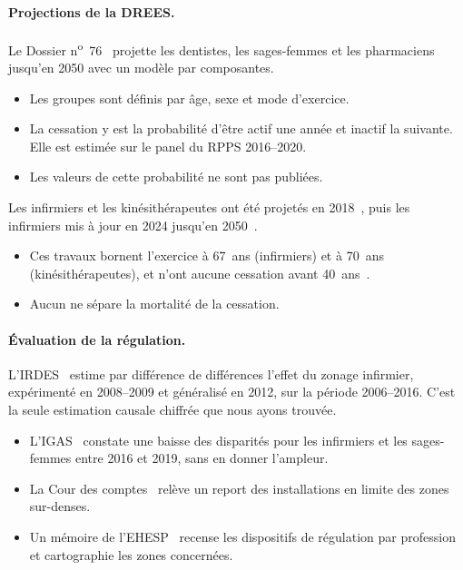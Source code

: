 \documentclass[11pt]{article}
\begin{document}
\paragraph{Projections de la DREES.}
Le Dossier n\textsuperscript{o}~76~\cite{dd76} projette les dentistes, les
sages-femmes et les pharmaciens jusqu'en 2050 avec un modèle par
composantes.
\begin{itemize}
\item Les groupes sont définis par âge, sexe et mode d'exercice.
\item La cessation y est la probabilité d'être actif une année et inactif la
  suivante. Elle est estimée sur le panel du RPPS 2016--2020.
\item Les valeurs de cette probabilité ne sont pas publiées.
\end{itemize}
Les infirmiers et les kinésithérapeutes ont été projetés en
2018~\cite{er1062,er1075}, puis les infirmiers mis à jour en 2024
jusqu'en 2050~\cite{er1319}.
\begin{itemize}
\item Ces travaux bornent l'exercice à 67~ans (infirmiers) et à 70~ans
  (kinésithérapeutes), et n'ont aucune cessation avant 40~ans~\cite{er1062,er1075}.
\item Aucun ne sépare la mortalité de la cessation.
\end{itemize}

\paragraph{Évaluation de la régulation.}
L'IRDES~\cite{irdes270} estime par différence de différences l'effet du
zonage infirmier, expérimenté en 2008--2009 et généralisé en 2012, sur la période 2006--2016. C'est la seule
estimation causale chiffrée que nous ayons trouvée.
\begin{itemize}
\item L'IGAS~\cite{igas2023} constate une baisse des disparités pour les
  infirmiers et les sages-femmes entre 2016 et 2019, sans en donner
  l'ampleur.
\item La Cour des comptes~\cite{ccomptes2024} relève un report des
  installations en limite des zones sur-denses.
\item Un mémoire de l'EHESP~\cite{bahroun2025} recense les dispositifs de
  régulation par profession et cartographie les zones concernées.
\end{itemize}
\end{document}
